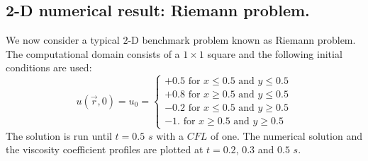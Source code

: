 \subsection{2-D numerical result: Riemann problem.}\label{sec:2dnum_sct2b}
%
We now consider a typical $2$-D benchmark problem known as Riemann problem. The computational domain consists of a $1 \times 1$ square and the following initial conditions are used:
%
\begin{equation}\label{eq:bg_2d_ic_sct2b}
u(\vec{r},0) = u_0 = \left\{
\begin{array}{l}
+0.5 \text{ for } x \leq 0.5 \text{ and } y \leq 0.5 \\
+0.8 \text{ for } x \geq 0.5 \text{ and } y \leq 0.5 \\
-0.2 \text{ for } x \leq 0.5 \text{ and } y \geq 0.5 \\
-1. \text{ for } x \geq 0.5 \text{ and } y \geq 0.5
\end{array}
\nonumber
\right.
\end{equation}
%
The solution is run until $t=0.5$ $s$ with a $CFL$ of one. The numerical solution and the viscosity coefficient profiles are plotted at $t=0.2$, $0.3$ and $0.5$ $s$. 